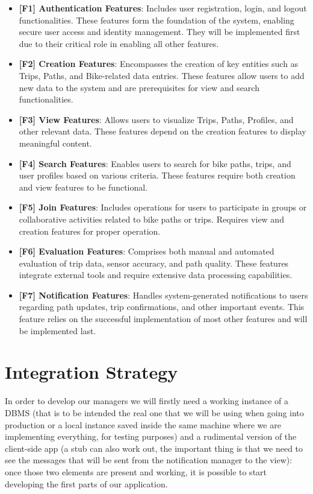 \begin{itemize}
    \item \textbf{[F1] Authentication Features}:  
    Includes user registration, login, and logout functionalities. These features form the foundation of the system, enabling secure user access and identity management. They will be implemented first due to their critical role in enabling all other features.

    \item \textbf{[F2] Creation Features}:  
    Encompasses the creation of key entities such as Trips, Paths, and Bike-related data entries. These features allow users to add new data to the system and are prerequisites for view and search functionalities.

    \item \textbf{[F3] View Features}:  
    Allows users to visualize Trips, Paths, Profiles, and other relevant data. These features depend on the creation features to display meaningful content.

    \item \textbf{[F4] Search Features}:  
    Enables users to search for bike paths, trips, and user profiles based on various criteria. These features require both creation and view features to be functional.

    \item \textbf{[F5] Join Features}:  
    Includes operations for users to participate in groups or collaborative activities related to bike paths or trips. Requires view and creation features for proper operation.

    \item \textbf{[F6] Evaluation Features}:  
    Comprises both manual and automated evaluation of trip data, sensor accuracy, and path quality. These features integrate external tools and require extensive data processing capabilities.

    \item \textbf{[F7] Notification Features}:  
    Handles system-generated notifications to users regarding path updates, trip confirmations, and other important events. This feature relies on the successful implementation of most other features and will be implemented last.
\end{itemize}

\section{Integration Strategy}
In order to develop our managers we will firstly need a working instance of a DBMS (that is to be intended the real one that we will be using when going into production or a local instance saved inside the same machine where we are implementing everything, for testing purposes) and a rudimental version of the client-side app (a stub can also work out, the important thing is that we need to see the messages that will be sent from the notification manager to the view): once those two elements are present and working, it is possible to start developing the first parts of our application.

